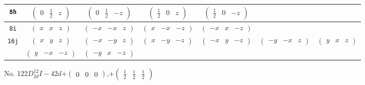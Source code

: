 \documentclass[fleqn,9pt,landscape]{jsarticle}
\begin{document}
\begin{center}
\begin{longtable}{ccccccc}
{\tt 8h} & $ \begin{pmatrix} 0 & \frac{1}{2} & z \end{pmatrix} $ & $ \begin{pmatrix} 0 & \frac{1}{2} & - z \end{pmatrix} $ & $ \begin{pmatrix} \frac{1}{2} & 0 & z \end{pmatrix} $ & $ \begin{pmatrix} \frac{1}{2} & 0 & - z \end{pmatrix} $ & $  $ & $  $ \\ \hline
{\tt 8i} & $ \begin{pmatrix} x & x & z \end{pmatrix} $ & $ \begin{pmatrix} - x & - x & z \end{pmatrix} $ & $ \begin{pmatrix} x & - x & - z \end{pmatrix} $ & $ \begin{pmatrix} - x & x & - z \end{pmatrix} $ & $  $ & $  $ \\ \hline
{\tt 16j} & $ \begin{pmatrix} x & y & z \end{pmatrix} $ & $ \begin{pmatrix} - x & - y & z \end{pmatrix} $ & $ \begin{pmatrix} x & - y & - z \end{pmatrix} $ & $ \begin{pmatrix} - x & y & - z \end{pmatrix} $ & $ \begin{pmatrix} - y & - x & z \end{pmatrix} $ & $ \begin{pmatrix} y & x & z \end{pmatrix} $ \\
& $ \begin{pmatrix} y & - x & - z \end{pmatrix} $ & $ \begin{pmatrix} - y & x & - z \end{pmatrix} $ & $  $ & $  $ & $  $ & $  $ \\
\end{longtable}
\end{center}
\newpage
No. 122\quad$D_{2d}^{12}$\quad$I-42d$\quad[ tetragonal ]\quad$+\begin{pmatrix} 0 & 0 & 0 \end{pmatrix}$,\quad $+\begin{pmatrix} \frac{1}{2} & \frac{1}{2} & \frac{1}{2} \end{pmatrix}$
\end{document}
